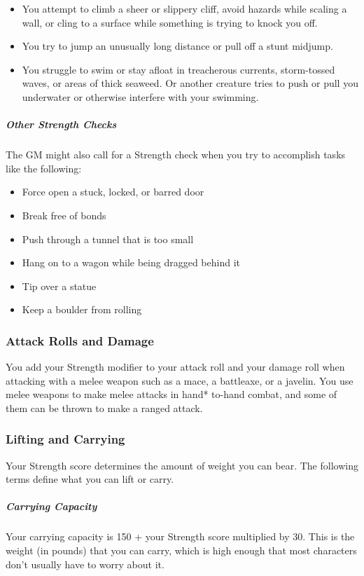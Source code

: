 \begin{itemize}
\item You attempt to climb a sheer or slippery cliff, avoid hazards while scaling a wall, or cling to a surface while something is trying to knock you off.
\item You try to jump an unusually long distance or pull off a stunt midjump.
\item You struggle to swim or stay afloat in treacherous currents, storm-tossed waves, or areas of thick seaweed. Or another creature tries to push or pull you underwater or otherwise interfere with your swimming.
\end{itemize}

\subparagraph*{Other Strength Checks} The GM might also call for a Strength check when you try to accomplish tasks like the following:

\begin{itemize}
\item Force open a stuck, locked, or barred door
\item Break free of bonds
\item Push through a tunnel that is too small
\item Hang on to a wagon while being dragged behind it
\item Tip over a statue
\item Keep a boulder from rolling
\end{itemize}

\subsubsection{Attack Rolls and Damage}

You add your Strength modifier to your attack roll and your damage roll when attacking with a melee weapon such as a mace, a battleaxe, or a javelin. You use melee weapons to make melee attacks in hand* to-hand combat, and some of them can be thrown to make a ranged attack.

\subsubsection{Lifting and Carrying}

Your Strength score determines the amount of weight you can bear. The following terms define what you can lift or carry.

\subparagraph*{Carrying Capacity} Your carrying capacity is 150 + your Strength score multiplied by 30. This is the weight (in pounds) that you can carry, which is high enough that most characters don't usually have to worry about it.

